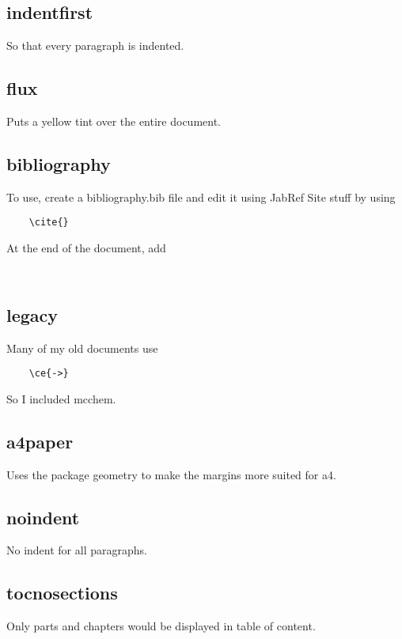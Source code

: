 \documentclass{article}
\begin{document}
\subsection{indentfirst}

So that every paragraph is indented.

\subsection{flux}

Puts a yellow tint over the entire document.

\subsection{bibliography}

To use, create a bibliography.bib file and edit it using JabRef
Site stuff by using 
\begin{verbatim}
	\cite{}
\end{verbatim}
At the end of the document, add 
\begin{verbatim}
	
\end{verbatim}

\subsection{legacy}

Many of my old documents use 

\begin{verbatim}
	\ce{->}
\end{verbatim}

So I included mcchem.

\subsection{a4paper}

Uses the package geometry to make the margins more suited for a4.

\subsection{noindent}

No indent for all paragraphs.

\subsection{tocnosections}

Only parts and chapters would be displayed in table of content.
\end{document}
